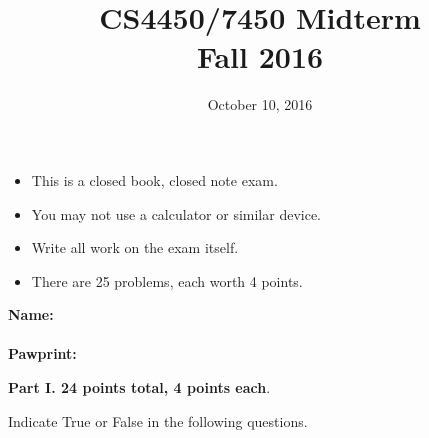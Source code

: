 \documentclass[12pt]{article}
\begin{document}
\title{\vspace{20ex}CS4450/7450 Midterm\\Fall 2016}
\date{October 10, 2016}


\maketitle
\thispagestyle{empty}

{\large
\begin{center}
\begin{minipage}{4.5in}
\begin{itemize}
\item This is a closed book, closed note exam.
\item You may not use a calculator or similar device.
\item Write all work on the exam itself.
\item There are 25 problems, each worth 4 points.
\end{itemize}
\vfill
\begin{tabbing}
{\bf Name:}\\\\
{\bf Pawprint:}
\end{tabbing}
\end{minipage}
\end{center}
}

\pagebreak


\noindent
{\bf {\textsc Part I.} 24 points total, 4 points each}.

\noindent
Indicate True or False in the following questions.
\end{document}
